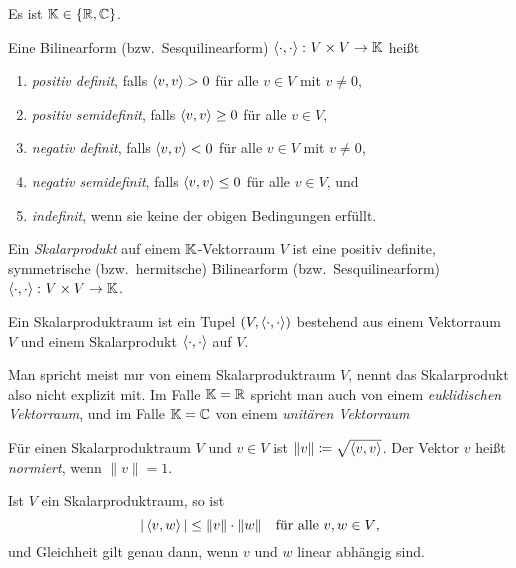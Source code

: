 \begin{notation}
  Es ist $\mathbb{K} \in \{\mathbb{R}, \mathbb{C}\}$.
\end{notation}


\begin{definition}
  Eine Bilinearform (bzw.\ Sesquilinearform) $\left\langle \cdot, \cdot \right\rangle \colon V \times V \to \mathbb{K}$ heißt
  \begin{enumerate}[leftmargin=*, label=\roman*)]
    \item
      \emph{positiv definit}, falls $\left\langle v,v \right\rangle > 0$ für alle $v \in V$ mit $v \neq 0$,
    \item
      \emph{positiv semidefinit}, falls $\left\langle v,v \right\rangle \geq 0$ für alle $v \in V$,
    \item
      \emph{negativ definit}, falls $\left\langle v,v \right\rangle < 0$ für alle $v \in V$ mit $v \neq 0$,
    \item
      \emph{negativ semidefinit}, falls $\left\langle v,v \right\rangle \leq 0$ für alle $v \in V$, und
    \item
      \emph{indefinit}, wenn sie keine der obigen Bedingungen erfüllt.
  \end{enumerate}
\end{definition}


\begin{definition}
  Ein \emph{Skalarprodukt} auf einem $\mathbb{K}$-Vektorraum $V$ ist eine positiv definite, symmetrische (bzw.\ hermitsche) Bilinearform (bzw.\ Sesquilinearform) $\left\langle \cdot, \cdot \right\rangle \colon V \times V \to \mathbb{K}$.
  
  Ein Skalarproduktraum ist ein Tupel $(V, \left\langle \cdot, \cdot \right\rangle)$ bestehend aus einem Vektorraum $V$ und einem Skalarprodukt $\left\langle \cdot, \cdot \right\rangle$ auf $V$.
\end{definition}


\begin{remark}
  Man spricht meist nur von einem Skalarproduktraum $V$, nennt das Skalarprodukt also nicht explizit mit.
  Im Falle $\mathbb{K} = \mathbb{R}$ spricht man auch von einem \emph{euklidischen Vektorraum}, und im Falle $\mathbb{K} = \mathbb{C}$ von einem \emph{unitären Vektorraum}
\end{remark}


\begin{definition}
  Für einen Skalarproduktraum $V$ und $v \in V$ ist $\|v\| \coloneqq \sqrt{\left\langle v,v \right\rangle}$.
  Der Vektor $v$ heißt \emph{normiert}, wenn $\|v\| = 1$.
\end{definition}


\begin{proposition}
  Ist $V$ ein Skalarproduktraum, so ist
  \[
    |\left\langle v,w \right\rangle| \leq \|v\| \cdot \|w\|
    \quad
    \text{für alle $v, w \in V$},
  \]
  und Gleichheit gilt genau dann, wenn $v$ und $w$ linear abhängig sind.
\end{proposition}


